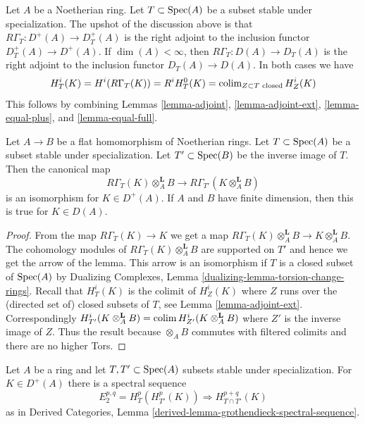 \begin{remark}
\label{remark-upshot}
Let $A$ be a Noetherian ring. Let $T \subset \mathop{\mathrm{Spec}}(A)$ be a
subset stable under specialization.
The upshot of the discussion above is that
$R\Gamma_T : D^+(A) \to D_T^+(A)$ is the right adjoint
to the inclusion functor $D_T^+(A) \to D^+(A)$.
If $\dim(A) < \infty$, then
$R\Gamma_T : D(A) \to D_T(A)$ is the right adjoint
to the inclusion functor $D_T(A) \to D(A)$.
In both cases we have
$$
H^i_T(K) = H^i(R\Gamma_T(K)) = R^iH^0_T(K) =
\mathop{\mathrm{colim}}\nolimits_{Z \subset T\text{ closed}} H^i_Z(K)
$$
This follows by combining
Lemmas \ref{lemma-adjoint}, \ref{lemma-adjoint-ext},
\ref{lemma-equal-plus}, and \ref{lemma-equal-full}.
\end{remark}

\begin{lemma}
\label{lemma-torsion-change-rings}
Let $A \to B$ be a flat homomorphism of Noetherian rings.
Let $T \subset \mathop{\mathrm{Spec}}(A)$ be a subset stable under specialization.
Let $T' \subset \mathop{\mathrm{Spec}}(B)$ be the inverse image of $T$.
Then the canonical map
$$
R\Gamma_T(K) \otimes_A^\mathbf{L} B
\longrightarrow
R\Gamma_{T'}(K \otimes_A^\mathbf{L} B)
$$
is an isomorphism for $K \in D^+(A)$. If $A$ and $B$ have finite
dimension, then this is true for $K \in D(A)$.
\end{lemma}

\begin{proof}
From the map $R\Gamma_T(K) \to K$ we get a map
$R\Gamma_T(K) \otimes_A^\mathbf{L} B \to K \otimes_A^\mathbf{L} B$.
The cohomology modules of $R\Gamma_T(K) \otimes_A^\mathbf{L} B$
are supported on $T'$ and hence we get the arrow of the lemma.
This arrow is an isomorphism if $T$ is a closed subset of $\mathop{\mathrm{Spec}}(A)$ by
Dualizing Complexes, Lemma \ref{dualizing-lemma-torsion-change-rings}.
Recall that $H^i_T(K)$ is the colimit of $H^i_Z(K)$ where $Z$ runs over
the (directed set of) closed subsets of $T$, see
Lemma \ref{lemma-adjoint-ext}.
Correspondingly
$H^i_{T'}(K \otimes_A^\mathbf{L} B) =
\mathop{\mathrm{colim}}\nolimits H^i_{Z'}(K \otimes_A^\mathbf{L} B)$ where $Z'$ is the inverse
image of $Z$. Thus the result because $\otimes_A B$ commutes
with filtered colimits and there are no higher Tors.
\end{proof}

\begin{lemma}
\label{lemma-local-cohomology-ss}
Let $A$ be a ring and let $T, T' \subset \mathop{\mathrm{Spec}}(A)$ subsets
stable under specialization. For $K \in D^+(A)$
there is a spectral sequence
$$
E_2^{p, q} = H^p_T(H^p_{T'}(K)) \Rightarrow H^{p + q}_{T \cap T'}(K)
$$
as in Derived Categories, Lemma
\ref{derived-lemma-grothendieck-spectral-sequence}.
\end{lemma}


